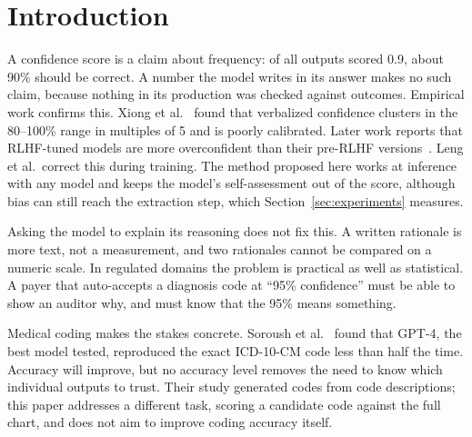 \documentclass[10pt,letterpaper]{article}
\begin{document}
\begin{abstract}
\medskip\noindent\textbf{Keywords:} LLM evaluation; calibration; uncertainty; auditability; weight of evidence; logistic regression; medical coding; risk adjustment.
\end{abstract}

\section{Introduction}

A confidence score is a claim about frequency: of all outputs scored 0.9, about 90\% should be correct. A number the model writes in its answer makes no such claim, because nothing in its production was checked against outcomes. Empirical work confirms this. Xiong et al.~\cite{xiong} found that verbalized confidence clusters in the 80--100\% range in multiples of 5 and is poorly calibrated. Later work reports that RLHF-tuned models are more overconfident than their pre-RLHF versions~\cite{leng}. Leng et al.\ correct this during training. The method proposed here works at inference with any model and keeps the model's self-assessment out of the score, although bias can still reach the extraction step, which Section~\ref{sec:experiments} measures.

Asking the model to explain its reasoning does not fix this. A written rationale is more text, not a measurement, and two rationales cannot be compared on a numeric scale. In regulated domains the problem is practical as well as statistical. A payer that auto-accepts a diagnosis code at ``95\% confidence'' must be able to show an auditor why, and must know that the 95\% means something.

Medical coding makes the stakes concrete. Soroush et al.~\cite{soroush} found that GPT-4, the best model tested, reproduced the exact ICD-10-CM code less than half the time. Accuracy will improve, but no accuracy level removes the need to know which individual outputs to trust. Their study generated codes from code descriptions; this paper addresses a different task, scoring a candidate code against the full chart, and does not aim to improve coding accuracy itself.
\end{document}
